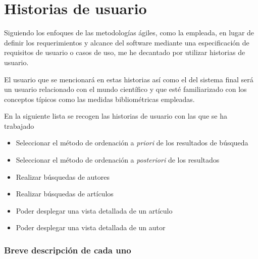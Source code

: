 \section{Historias de usuario}
Siguiendo los enfoques de las metodologías ágiles, como la empleada, en lugar de definir los requerimientos y alcance del software mediante una especificación de requisitos de usuario o casos de uso, me he decantado por utilizar historias de usuario.

El usuario que se mencionará en estas historias así como el del sistema final será un usuario relacionado con el mundo científico y que esté familiarizado con los conceptos típicos como las medidas bibliométricas empleadas.

En la siguiente lista se recogen las historias de usuario con las que se ha trabajado

\begin{itemize}
	\item Seleccionar el método de ordenación a \textit{priori} de los resultados de búsqueda
	\item Seleccionar el método de ordenación a \textit{posteriori} de los resultados
	\item Realizar búsquedas de autores
	\item Realizar búsquedas de artículos
	\item Poder desplegar una vista detallada de un artículo 
	\item Poder desplegar una vista detallada de un autor
	
\end{itemize}

\subsubsection{Breve descripción de cada uno}